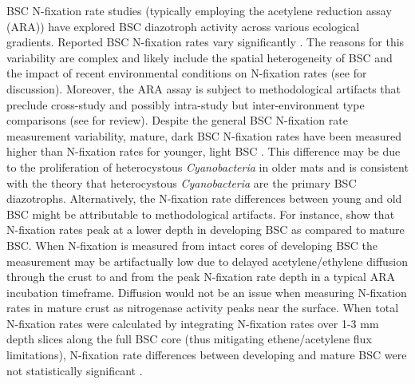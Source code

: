 BSC N-fixation rate studies (typically employing the acetylene reduction assay
(ARA)) have explored BSC diazotroph activity across various ecological
gradients. Reported BSC N-fixation rates vary significantly \citep{Evans_2001}.
The reasons for this variability are complex and likely include the spatial
heterogeneity of BSC \citep{Evans_2001} and the impact of recent environmental
conditions on N-fixation rates (see \citet{Belnap_2001} for discussion).
Moreover, the ARA assay is subject to methodological artifacts that preclude
cross-study and possibly intra-study but inter-environment type comparisons
(see \citet{Belnap_2001} for review). Despite the general BSC N-fixation rate
measurement variability, mature, dark BSC N-fixation rates have been measured
higher than N-fixation rates for younger, light BSC \citep{Belnap_2002,
14766579}. This difference may be due to the proliferation of heterocystous
\textit{Cyanobacteria} in older mats and is consistent with the theory that
heterocystous \textit{Cyanobacteria} are the primary BSC diazotrophs. Alternatively, the
N-fixation rate differences between young and old BSC might be attributable to
methodological artifacts. For instance, \citet{15643930} show that N-fixation
rates peak at a lower depth in developing BSC as compared to mature BSC. When 
N-fixation is measured from intact cores of developing BSC the measurement
may be artifactually low due to delayed acetylene/ethylene diffusion through
the crust to and from the peak N-fixation rate depth in a typical ARA
incubation timeframe. Diffusion would not be an issue when measuring N-fixation
rates in mature crust as nitrogenase activity peaks near the surface. When
total N-fixation rates were calculated by integrating N-fixation rates over 1-3
mm depth slices along the full BSC core (thus mitigating ethene/acetylene flux
limitations), N-fixation rate differences between developing and mature BSC
were not statistically significant \citep{15643930}.

